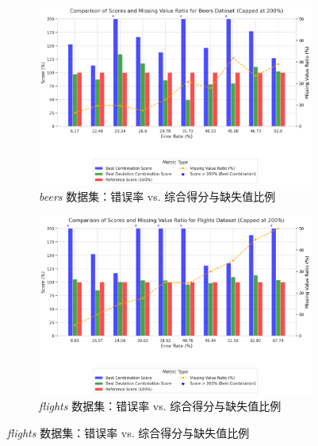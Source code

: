 \documentclass[10pt]{article} %
\numberwithin{equation}{section}
\begin{document}
\begin{figure}[htbp]
  \centering
  \begin{subfigure}{0.48\linewidth} %
    \centering
    \includegraphics[width=\linewidth]{beers_error.png} %
    \caption{\textit{beers} 数据集：错误率 vs. 综合得分与缺失值比例}
    \label{fig:beers_error}
  \end{subfigure}
  \hfill
  \begin{subfigure}{0.48\linewidth}
    \centering
    \includegraphics[width=\linewidth]{flights_error.png}
    \caption{\textit{flights} 数据集：错误率 vs. 综合得分与缺失值比例}
    \label{fig:flights_error}
  \end{subfigure}

  \vspace{0.5em} %


\end{figure}
\end{document}
